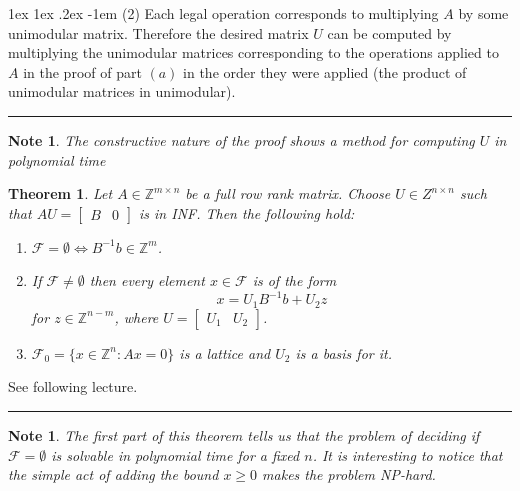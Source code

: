 \documentclass[11pt]{article}
\makeatletter
\renewcommand\paragraph{\@startsection{paragraph}{4}{0mm}%
                                    {1ex \@plus1ex \@minus.2ex}%
                                    {-1em}%
                                    {\normalfont\normalsize\bfseries}}
\newenvironment{proof}{{\bf Proof:  }}{\hfill\rule{2mm}{2mm}}
\newtheorem{theorem}[fact]{Theorem}
\newtheorem{note}[fact]{Note}
\newcommand{\Z}{\ensuremath{\mathbb Z}}
\makeatother
\begin{document}
\begin{proof}
\paragraph{(2)}
Each legal operation corresponds to multiplying $A$ by some unimodular matrix. Therefore the desired matrix $U$ can be computed by multiplying the unimodular matrices corresponding to the operations applied to $A$ in the proof of part $(a)$ in the order they were applied (the product of unimodular matrices in unimodular).
\end{proof}
\begin{note}
The constructive nature of the proof shows a method for computing $U$ in polynomial time
\end{note}
\begin{theorem}
Let $A \in \Z^{m \times n}$ be a full row rank matrix. Choose $U \in Z^{n\times n}$ such that $AU = \begin{bmatrix} B & 0 \end{bmatrix}$ is in INF. Then the following hold:
\begin{enumerate}
\item $\mathcal{F} = \emptyset \iff B^{-1}b \in \Z^m$.
\item If $\mathcal{F} \neq \emptyset$ then every element $x \in \mathcal{F}$ is of the form
$$x = U_1 B^{-1}b + U_2z$$
for $z \in \Z^{n-m}$, where $U = \begin{bmatrix} U_1 & U_2 \end{bmatrix}$.
\item $\mathcal{F}_0 = \{x \in \Z^n: Ax=0\}$ is a lattice and $U_2$ is a basis for it.
\end{enumerate}
\end{theorem}
\begin{proof}
See following lecture.
\end{proof}
\begin{note}
The first part of this theorem tells us that the problem of deciding if $\mathcal{F} = \emptyset$ is solvable in polynomial time for a fixed $n$. It is interesting to notice that the simple act of adding the bound $x \geq 0$ makes the problem NP-hard.
\end{note}
\end{document}
